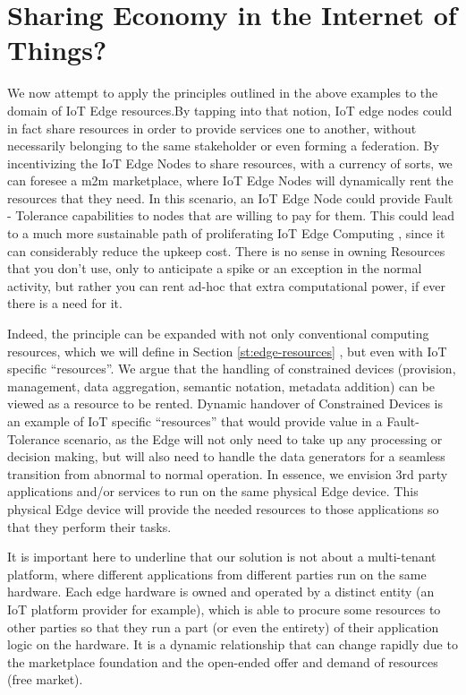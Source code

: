 \section{Sharing Economy in the Internet of Things?}

We now attempt to apply the principles outlined in the above examples to the domain of IoT Edge resources.By tapping into that notion, IoT edge nodes could in fact share resources in order to provide services one to another, without necessarily belonging to the same stakeholder or even forming a federation. By incentivizing the IoT Edge Nodes to share resources, with a currency of sorts, we can foresee a \acrfull{m2m} marketplace, where IoT Edge Nodes will dynamically rent the resources that they need. In this scenario, an IoT Edge Node could provide Fault - Tolerance capabilities to nodes that are willing to pay for them. This could lead to a much more sustainable path of proliferating IoT Edge Computing , since it can considerably reduce the upkeep cost. There is no sense in owning Resources that you don’t use, only to anticipate a spike or an exception in the normal activity, but rather you can rent ad-hoc that extra computational power, if ever there is a need for it.

Indeed, the principle can be expanded with not only conventional computing resources, which we will define in Section \ref{st:edge-resources}  , but even with IoT specific “resources”. We argue that the handling of constrained devices (provision, management, data aggregation, semantic notation, metadata addition) can be viewed as a resource to be rented. Dynamic handover of Constrained Devices is an example of IoT specific “resources” that would provide value in a Fault-Tolerance scenario, as the Edge will not only need to take up any processing or decision making, but will also need to handle the data generators for a seamless transition from abnormal to normal operation. In essence, we envision 3rd party applications and/or services to run on the same physical Edge device. This physical Edge device will provide the needed resources to those applications so that they perform their tasks.

It is important here to underline that our solution is not about a multi-tenant platform, where different applications from different parties run on the same hardware. Each edge hardware is owned and operated by a distinct entity (an IoT platform provider for example), which is able to procure some resources to other parties so that they run a part (or even the entirety) of their application logic on the hardware. It is a dynamic relationship that can change rapidly due to the marketplace foundation and the open-ended offer and demand of resources (free market).


